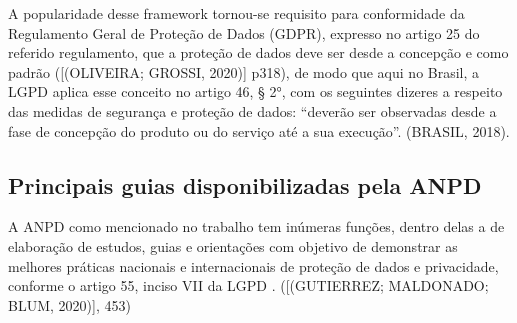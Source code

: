 \documentclass[
	12pt,				%
	openright,			%
	oneside,			%
	a4paper,			%
	english,			%
	french,				%
	spanish,			%
	brazil,				%
	]{abntex2}
\begin{document}
A popularidade desse framework tornou-se requisito para conformidade da Regulamento Geral de Proteção de Dados (GDPR), expresso no artigo 25 do referido  regulamento, que a proteção de dados deve ser desde a concepção e como padrão ([(OLIVEIRA; GROSSI, 2020)] p318), de modo que aqui no Brasil, a LGPD aplica esse conceito no artigo 46, § 2°, com os seguintes dizeres a respeito das medidas de segurança e proteção de dados: “deverão ser observadas desde a fase de concepção do produto ou do serviço até a sua execução”. (BRASIL, 2018).

\subsection{ Principais guias disponibilizadas pela ANPD  }

A ANPD como mencionado no trabalho tem inúmeras funções, dentro delas a de elaboração de estudos, guias e orientações com objetivo de demonstrar as melhores práticas nacionais e internacionais de proteção de dados e privacidade, conforme o artigo 55, inciso VII da LGPD . ([(GUTIERREZ; MALDONADO; BLUM, 2020)], 453)
\end{document}
